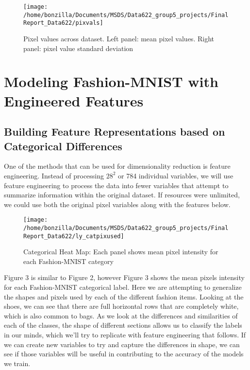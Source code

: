 \documentclass{article}
\begin{document}
\begin{figure}

{\centering \texttt{[image: /home/bonzilla/Documents/MSDS/Data622\_group5\_projects/FinalReport\_Data622/pixvals]} 

}

\caption{Pixel values across dataset. Left panel: mean pixel values. Right panel: pixel value standard deviation}\label{fig:unnamed-chunk-2}
\end{figure}

\hypertarget{modeling-fashion-mnist-with-engineered-features}{%
\section{Modeling Fashion-MNIST with Engineered
Features}\label{modeling-fashion-mnist-with-engineered-features}}

\hypertarget{building-feature-representations-based-on-categorical-differences}{%
\subsection{Building Feature Representations based on Categorical
Differences}\label{building-feature-representations-based-on-categorical-differences}}

One of the methods that can be used for dimensionality reduction is
feature engineering. Instead of processing \(28^2\) or 784 individual
variables, we will use feature engineering to process the data into
fewer variables that attempt to summarize information within the
original dataset. If resources were unlimited, we could use both the
original pixel variables along with the features below.

\begin{figure}

{\centering \texttt{[image: /home/bonzilla/Documents/MSDS/Data622\_group5\_projects/FinalReport\_Data622/ly\_catpixused]} 

}

\caption{Categorical Heat Map: Each panel shows mean pixel intensity for each Fashion-MNIST category}\label{fig:unnamed-chunk-3}
\end{figure}

Figure 3 is similar to Figure 2, however Figure 3 shows the mean pixels
intensity for each Fashion-MNIST categorical label. Here we are
attempting to generalize the shapes and pixels used by each of the
different fashion items. Looking at the shoes, we can see that there are
full horizontal rows that are completely white, which is also common to
bags. As we look at the differences and similarities of each of the
classes, the shape of different sections allows us to classify the
labels in our minds, which we'll try to replicate with feature
engineering that follows. If we can create new variables to try and
capture the differences in shape, we can see if those variables will be
useful in contributing to the accuracy of the models we train.
\end{document}
